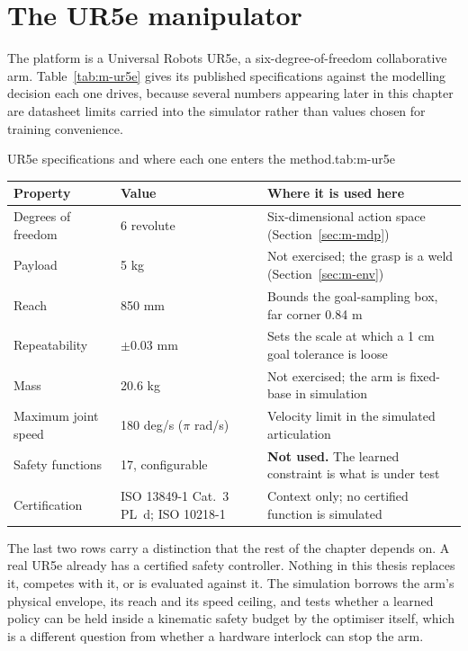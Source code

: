 \section{The UR5e manipulator}\label{sec:m-ur5e}

The platform is a Universal Robots UR5e, a six-degree-of-freedom collaborative arm.
Table~\ref{tab:m-ur5e} gives its published specifications \cite{universalrobots2023ur5e} against the
modelling decision each one drives, because several numbers appearing later in this chapter are
datasheet limits carried into the simulator rather than values chosen for training convenience.

\begin{kuettable}{UR5e specifications and where each one enters the method.}{tab:m-ur5e}
\begin{tabular*}{\textwidth}{@{\extracolsep{\fill}}p{}p{}p{}}
\toprule
Property & Value & Where it is used here\\
\midrule
Degrees of freedom & 6 revolute & Six-dimensional action space (Section~\ref{sec:m-mdp})\\
Payload & 5 kg & Not exercised; the grasp is a weld (Section~\ref{sec:m-env})\\
Reach & 850 mm & Bounds the goal-sampling box, far corner 0.84 m\\
Repeatability & \(\pm\)0.03 mm & Sets the scale at which a 1 cm goal tolerance is loose\\
Mass & 20.6 kg & Not exercised; the arm is fixed-base in simulation\\
Maximum joint speed & 180 deg/s (\(\pi\) rad/s) & Velocity limit in the simulated articulation\\
Safety functions & 17, configurable & \textbf{Not used.} The learned constraint is what is under test\\
Certification & ISO 13849-1 Cat.~3 PL~d; ISO 10218-1 & Context only; no certified function is simulated\\
\bottomrule
\end{tabular*}
\end{kuettable}

The last two rows carry a distinction that the rest of the chapter depends on. A real UR5e already
has a certified safety controller. Nothing in this thesis replaces it, competes with it, or is
evaluated against it. The simulation borrows the arm's physical envelope, its reach and its speed
ceiling, and tests whether a learned policy can be held inside a kinematic safety budget by the
optimiser itself, which is a different question from whether a hardware interlock can stop the arm.

